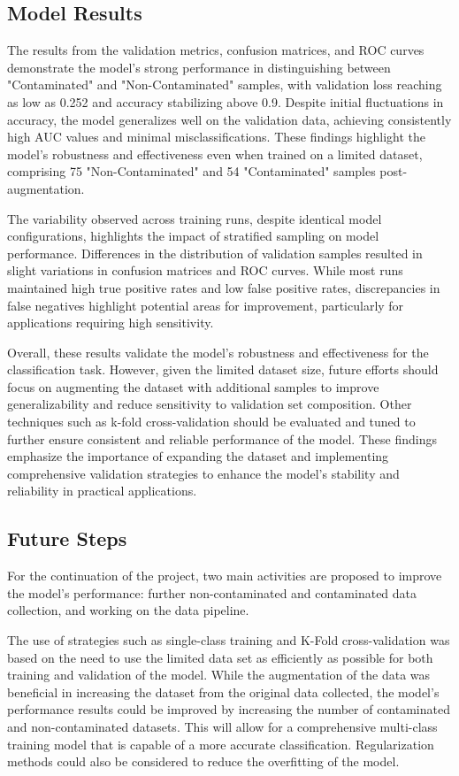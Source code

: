 \documentclass[12pt]{report}
\begin{document}
\subsection{Model Results}

The results from the validation metrics, confusion matrices, and ROC curves demonstrate the model's strong performance in distinguishing between "Contaminated" and "Non-Contaminated" samples, with validation loss reaching as low as 0.252 and accuracy stabilizing above 0.9. Despite initial fluctuations in accuracy, the model generalizes well on the validation data, achieving consistently high AUC values and minimal misclassifications. These findings highlight the model’s robustness and effectiveness even when trained on a limited dataset, comprising 75 "Non-Contaminated" and 54 "Contaminated" samples post-augmentation.

The variability observed across training runs, despite identical model configurations, highlights the impact of stratified sampling on model performance. Differences in the distribution of validation samples resulted in slight variations in confusion matrices and ROC curves. While most runs maintained high true positive rates and low false positive rates, discrepancies in false negatives highlight potential areas for improvement, particularly for applications requiring high sensitivity.

Overall, these results validate the model's robustness and effectiveness for the classification task. However, given the limited dataset size, future efforts should focus on augmenting the dataset with additional samples to improve generalizability and reduce sensitivity to validation set composition. Other techniques such as k-fold cross-validation should be evaluated and tuned to further ensure consistent and reliable performance of the model. These findings emphasize the importance of expanding the dataset and implementing comprehensive validation strategies to enhance the model's stability and reliability in practical applications.

\subsection{Future Steps}

For the continuation of the project, two main activities are proposed to improve the model’s performance: further non-contaminated and contaminated data collection, and working on the data pipeline. 

The use of strategies such as single-class training and K-Fold cross-validation was based on the need to use the limited data set as efficiently as possible for both training and validation of the model. While the augmentation of the data was beneficial in increasing the dataset from the original data collected, the model’s performance results could be improved by increasing the number of contaminated and non-contaminated datasets. This will allow for a comprehensive multi-class training model that is capable of a more accurate classification. Regularization methods could also be considered to reduce the overfitting of the model. 
\end{document}
